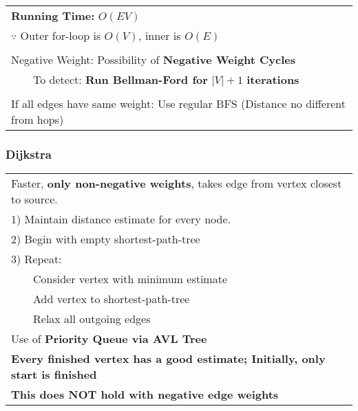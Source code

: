 \documentclass{article}
\newcommand{\tabitem}{~~\llap{\textbullet}~~}
\begin{document}
    \begin{tabular}{l}
        \textbf{Running Time:} $O(EV)$\\
        $\because$ Outer for-loop is $O(V)$, inner is $O(E)$\\\\
        Negative Weight: Possibility of \textbf{Negative Weight Cycles}\\
        \tabitem To detect: \textbf{Run Bellman-Ford for }$|V| + 1$ \textbf{iterations}\\\\
        If all edges have same weight: Use regular BFS (Distance no different from hops)\\
    \end{tabular} 

    \pagebreak

    \subsubsection{Dijkstra}

    
    \begin{tabular}{l}
        Faster, \textbf{only non-negative weights}, takes edge from vertex closest to source.\\
        1) Maintain distance estimate for every node.\\
        2) Begin with empty shortest-path-tree\\
        3) Repeat: \\
        \tabitem Consider vertex with minimum estimate\\
        \tabitem Add vertex to shortest-path-tree\\
        \tabitem Relax all outgoing edges\\
        Use of \textbf{Priority Queue via AVL Tree}\\
        \textbf{Every finished vertex has a good estimate; Initially, only start is finished}\\
        \textbf{This does NOT hold with negative edge weights}\\
    \end{tabular}
\end{document}
